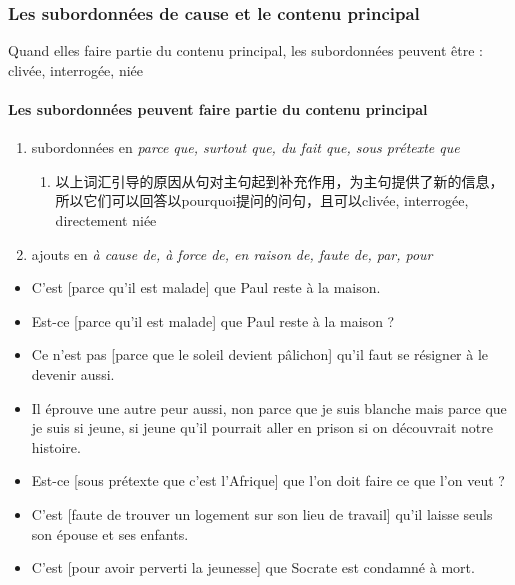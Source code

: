 \documentclass[UTF8]{report}
\begin{document}
\subsubsection{Les subordonnées de cause et le contenu principal}
Quand elles faire partie du contenu principal, les subordonnées peuvent être : clivée, interrogée, niée
\paragraph{Les subordonnées peuvent faire partie du contenu principal}
\begin{enumerate}
    \item subordonnées en \textit{parce que, surtout que, du fait que, sous prétexte que}
    \begin{enumerate}
        \item 以上词汇引导的原因从句对主句起到补充作用，为主句提供了新的信息，所以它们可以回答以pourquoi提问的问句，且可以clivée, interrogée, directement niée
    \end{enumerate}
    \item ajouts en \textit{à cause de, à force de, en raison de, faute de, par, pour}
\end{enumerate}
\begin{itemize}
    \item C’est [parce qu’il est malade] que Paul reste à la maison.
    \item Est-ce [parce qu’il est malade] que Paul reste à la maison ?
    \item Ce n’est pas [parce que le soleil devient pâlichon] qu’il faut se résigner à le devenir aussi.
    \item Il éprouve une autre peur aussi, non parce que je suis blanche mais parce que je suis si jeune, si jeune qu’il pourrait aller en prison si on découvrait notre histoire.
    \item Est-ce [sous prétexte que c’est l’Afrique] que l’on doit faire ce que l’on veut ?
    \item C’est [faute de trouver un logement sur son lieu de travail] qu’il laisse seuls son épouse et ses enfants.
    \item C’est [pour avoir perverti la jeunesse] que Socrate est condamné à mort.
\end{itemize}
\end{document}
